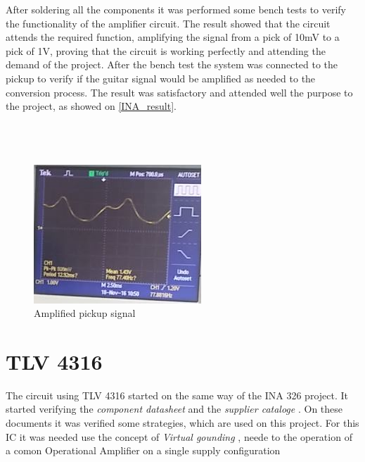After soldering all the components it was performed some bench tests to
verify the functionality of the amplifier circuit. The result showed that the
circuit attends the required function, amplifying the signal from a pick of 10mV
to a pick of 1V, proving that the circuit is working perfectly and attending the
demand of the project. After the bench test the system was connected to the pickup
to verify if the guitar signal would be amplified as needed to the conversion process.
The result was satisfactory and attended well the purpose to the project, as showed on \autoref{INA_result}.
\\
\\
\\
\\
\begin{figure}[!htpb]
\centering
\caption{Amplified pickup signal}
\label{INA_result}
\includegraphics[scale=1]{images/INA_result}
\end{figure}

\section{TLV 4316}
The circuit using TLV 4316 started on the same way of the INA 326 project.
It started verifying the \textit{component datasheet} \cite{TLV4316} and the \textit{supplier cataloge} \cite{OpAmps}.
On these documents it was verified some strategies, which are used on this project. For this IC it was needed use the
concept of \textit{Virtual gounding} \cite{OpAmps}, neede to the operation of a comon Operational Amplifier on a single
supply configuration
